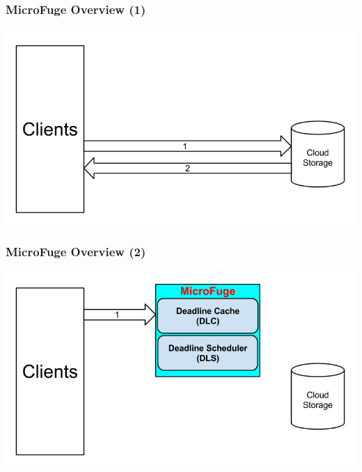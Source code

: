 \documentclass{beamer}
\newcommand{\myv}{\vspace{3 mm}}
\begin{document}

\begin{frame}
  \frametitle{MicroFuge Overview (1)}
  \begin{center}
    \includegraphics[scale=0.39]{img/MF_FULL_V8_1.png}
  \end{center}
\end{frame}

\begin{frame}
  \frametitle{MicroFuge Overview (2)}
  \begin{center}
    \includegraphics[scale=0.39]{img/MF_FULL_V8_2.png}
  \end{center}
\end{frame}
\end{document}
